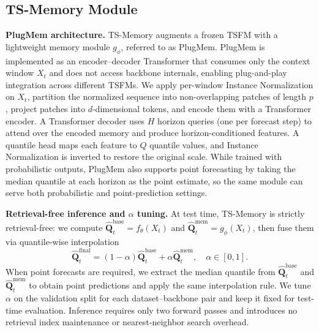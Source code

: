 \subsection{TS-Memory Module}
\noindent\textbf{PlugMem architecture.}
TS-Memory augments a frozen TSFM with a lightweight memory module $g_{\phi}$, referred to as PlugMem.
PlugMem is implemented as an encoder--decoder Transformer that consumes only the context window $X_t$ and does not access backbone internals, enabling plug-and-play integration across different TSFMs.
We apply per-window Instance Normalization on $X_t$, partition the normalized sequence into non-overlapping patches of length $p$,
project patches into $d$-dimensional tokens, and encode them with a Transformer encoder.
A Transformer decoder uses $H$ horizon queries (one per forecast step) to attend over the encoded memory and produce horizon-conditioned features.
A quantile head maps each feature to $Q$ quantile values, and Instance Normalization is inverted to restore the original scale.
While trained with probabilistic outputs, PlugMem also supports point forecasting by taking the median quantile at each horizon as the point estimate, so the same module can serve both probabilistic and point-prediction settings.

\noindent\textbf{Retrieval-free inference and $\alpha$ tuning.}
At test time, TS-Memory is strictly retrieval-free:
we compute $\widehat{\mathbf{Q}}^{\text{base}}_t=f_{\theta}(X_t)$ and $\widehat{\mathbf{Q}}^{\text{mem}}_t=g_{\phi}(X_t)$, then fuse them via quantile-wise interpolation
\begin{equation}
    \widehat{\mathbf{Q}}^{\text{final}}_t=(1-\alpha)\widehat{\mathbf{Q}}^{\text{base}}_t+\alpha \widehat{\mathbf{Q}}^{\text{mem}}_t, \quad \alpha \in [0,1].
\end{equation}
When point forecasts are required, we extract the median quantile from $\widehat{\mathbf{Q}}^{\text{base}}_t$ and $\widehat{\mathbf{Q}}^{\text{mem}}_t$ to obtain point predictions and apply the same interpolation rule.
We tune $\alpha$ on the validation split for each dataset--backbone pair and keep it fixed for test-time evaluation.
Inference requires only two forward passes and introduces no retrieval index maintenance or nearest-neighbor search overhead.

